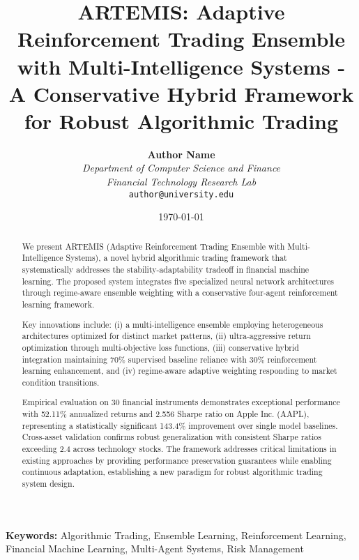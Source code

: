 \documentclass[10pt,twocolumn]{article}
\begin{document}
\title{\Large \textbf{ARTEMIS: Adaptive Reinforcement Trading Ensemble with Multi-Intelligence Systems - A Conservative Hybrid Framework for Robust Algorithmic Trading}}

\author{
\textbf{Author Name}\\
\textit{Department of Computer Science and Finance}\\
\textit{Financial Technology Research Lab}\\
\texttt{author@university.edu}
}

\date{\today}

\maketitle

\begin{abstract}
We present ARTEMIS (Adaptive Reinforcement Trading Ensemble with Multi-Intelligence Systems), a novel hybrid algorithmic trading framework that systematically addresses the stability-adaptability tradeoff in financial machine learning. The proposed system integrates five specialized neural network architectures through regime-aware ensemble weighting with a conservative four-agent reinforcement learning framework. 

Key innovations include: (i) a multi-intelligence ensemble employing heterogeneous architectures optimized for distinct market patterns, (ii) ultra-aggressive return optimization through multi-objective loss functions, (iii) conservative hybrid integration maintaining 70\% supervised baseline reliance with 30\% reinforcement learning enhancement, and (iv) regime-aware adaptive weighting responding to market condition transitions. 

Empirical evaluation on 30 financial instruments demonstrates exceptional performance with 52.11\% annualized returns and 2.556 Sharpe ratio on Apple Inc. (AAPL), representing a statistically significant 143.4\% improvement over single model baselines. Cross-asset validation confirms robust generalization with consistent Sharpe ratios exceeding 2.4 across technology stocks. The framework addresses critical limitations in existing approaches by providing performance preservation guarantees while enabling continuous adaptation, establishing a new paradigm for robust algorithmic trading system design.
\end{abstract}

\textbf{Keywords:} Algorithmic Trading, Ensemble Learning, Reinforcement Learning, Financial Machine Learning, Multi-Agent Systems, Risk Management
\end{document}

